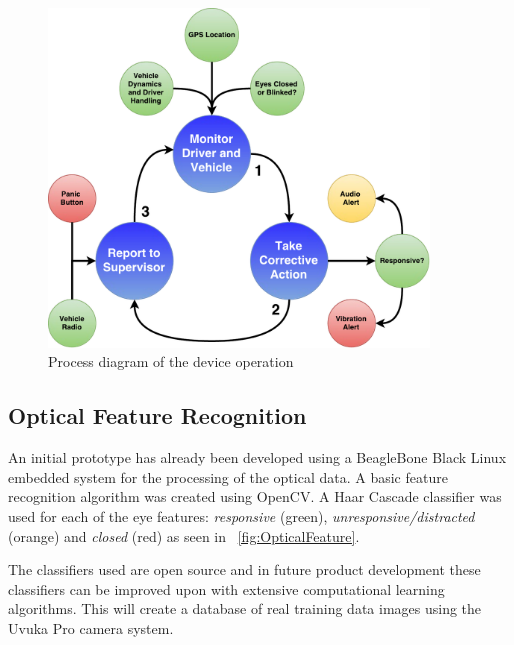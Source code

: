 \begin{figure}[H]
\centering
\includegraphics[width=0.9\textwidth]{images/NVP_Poster_Flowchart.pdf}
\vskip10pt
\caption[Device Operation Activity Diagram]{Process diagram of the device operation}
\label{fig:DeviceFlowChart}
\end{figure}

\newpage 
\subsection{Optical Feature Recognition}

An initial prototype has already been developed using a BeagleBone Black Linux embedded system for the processing of the optical data. A basic feature recognition algorithm was created using OpenCV. A Haar Cascade classifier was used for each of the eye features: \textit{responsive} (green), \textit{unresponsive/distracted} (orange) and \textit{closed} (red) as seen in ~\cref{fig:OpticalFeature}. 

The classifiers used are open source and in future product development these classifiers can be improved upon with extensive computational learning algorithms. This will create a database of real training data images using the Uvuka Pro camera system.

